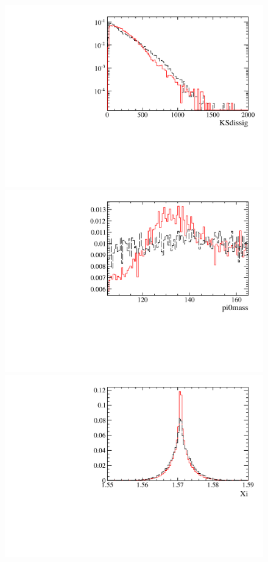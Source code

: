 \begin{figure} [htb!]
\begin{center}
\includegraphics[scale=0.20]{figs/KSdissigFULL.pdf}
\includegraphics[scale=0.20]{figs/pi0massFULL.pdf}
\includegraphics[scale=0.20]{figs/XiFULL.pdf}

\end{center}
\end{figure}

